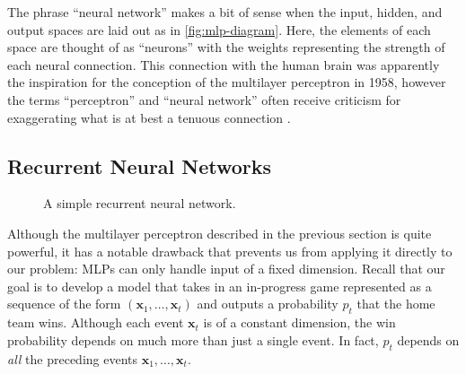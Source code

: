 The phrase ``neural network'' makes a bit of sense when the input, hidden, and output spaces are laid out as in \autoref{fig:mlp-diagram}. Here, the elements of each space are thought of as ``neurons'' with the weights representing the strength of each neural connection.
This connection with the human brain was apparently the inspiration for the conception of the multilayer perceptron in 1958, however the terms ``perceptron'' and ``neural network'' often receive criticism for exaggerating what is at best a tenuous connection \cite[\S 13.2.7]{PML}.

\subsection{Recurrent Neural Networks}

\begin{figure}[t]
	\centering

	\caption{A simple recurrent neural network.}
	\label{fig:simple-rnn}
\end{figure}

Although the multilayer perceptron described in the previous section is quite powerful, it has a notable drawback that prevents us from applying it directly to our problem: MLPs can only handle input of a fixed dimension. Recall that our goal is to develop a model that takes in an in-progress game represented as a sequence of the form $(\mathbf x_1, \ldots, \mathbf x_t)$ and outputs a probability $p_t$ that the home team wins. Although each event $\mathbf x_t$ is of a constant dimension, the win probability depends on much more than just a single event. In fact, $p_t$ depends on \emph{all} the preceding events $\mathbf x_1, \ldots, \mathbf x_t$.

